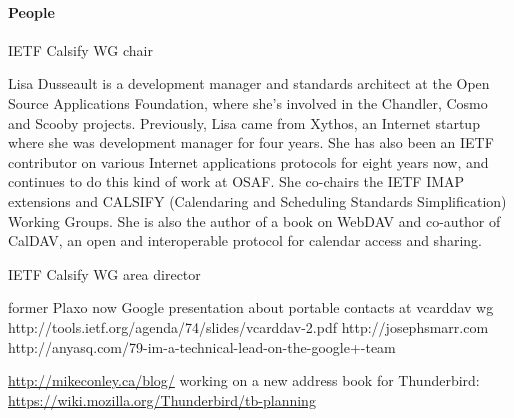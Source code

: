 \documentclass[12pt,a4paper]{scrartcl}		%
\begin{document}


\paragraph{People}
\begin{description}[\breaklabel\setleftmargin{1ex}]

  \item[Eliot Lear <lear@cisco.com>]
      IETF Calsify WG chair

  \item[Lisa Dusseault]
      
    Lisa Dusseault is a development manager and standards architect at the Open
    Source Applications Foundation, where she's involved in the Chandler, Cosmo
    and Scooby projects. Previously, Lisa came from Xythos, an Internet startup
    where she was development manager for four years. She has also been an IETF
    contributor on various Internet applications protocols for eight years now,
    and continues to do this kind of work at OSAF. She co-chairs the IETF IMAP
    extensions and CALSIFY (Calendaring and Scheduling Standards Simplification)
    Working Groups. She is also the author of a book on WebDAV and co-author of
    CalDAV, an open and interoperable protocol for calendar access and sharing.

  \item[Peter Saint-Andre <stpeter@stpeter.im>]

    IETF Calsify WG area director

  \item[Joseph Smarr]

    former Plaxo now Google
    presentation about portable contacts at vcarddav wg http://tools.ietf.org/agenda/74/slides/vcarddav-2.pdf
    http://josephsmarr.com
    http://anyasq.com/79-im-a-technical-lead-on-the-google+-team

  \item[Mike Conley]

    \url{http://mikeconley.ca/blog/}
    working on a new address book for Thunderbird: \url{https://wiki.mozilla.org/Thunderbird/tb-planning}




\end{description}
\end{document}
